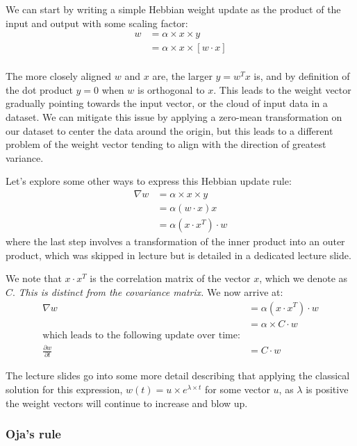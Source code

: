\documentclass[main]{subfiles}
\begin{document}
We can start by writing a simple Hebbian weight update as the product of the input and output with some scaling factor:
\begin{align}
     w &= \alpha \times x \times y\\
        &= \alpha \times x \times [w \cdot x]\\
\end{align}

The more closely aligned $w$ and $x$ are, the larger $y = w^T x$ is, and by definition of the dot product $y = 0$ when $w$ is orthogonal to $x$. This leads to the weight vector gradually pointing towards the input vector, or the cloud of input data in a dataset. We can mitigate this issue by applying a zero-mean transformation on our dataset to center the data around the origin, but this leads to a different problem of the weight vector tending to align with the direction of greatest variance.

Let's explore some other ways to express this Hebbian update rule:
\begin{align}
    \nabla w &= \alpha \times x \times y\\
        &= \alpha (w \cdot x) x\\
        &= \alpha (x \cdot x^T) \cdot w
\end{align}
where the last step involves a transformation of the inner product into an outer product, which was skipped in lecture but is detailed in a dedicated lecture slide.

We note that $x \cdot x^T$ is the correlation matrix of the vector $x$, which we denote as $C$. \textit{This is distinct from the covariance matrix.} We now arrive at:
\begin{align}
    \nabla w &= \alpha (x \cdot x^T) \cdot w\\
        &= \alpha \times C \cdot w\\
    \text{which leads to the following update over time:}\\
    \frac{\partial w}{\partial t} &= C \cdot w
\end{align}

The lecture slides go into some more detail describing that applying the classical solution for this expression, $w(t) = u \times e^{\lambda \times t}$ for some vector $u$, as $\lambda$ is positive the weight vectors will continue to increase and blow up.

\subsubsection{Oja's rule}
\end{document}
